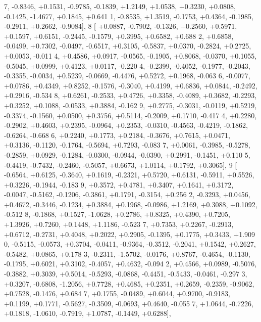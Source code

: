 \begin{DoxyCode}
      7, -0.8346, +0.1531, -0.9785, -0.1839, +1.2149, +1.0538, +0.3230, +0.0808, -0.1425, -1.4677, +0.1845, +0.641
      1, -0.8535, +1.3519, -0.1753, +0.4364, -0.1985, -0.2911, +0.2662, -0.9084],
8 [ +0.0887, -0.7902, -0.1326, +0.2560, +0.5971, +0.1597, +0.6151, -0.2445, -0.1579, +0.3995, +0.6582, +0.688
      2, +0.6858, -0.0499, +0.7302, -0.0497, -0.6517, +0.3105, -0.5837, +0.0370, -0.2824, +0.2725, +0.0053, -0.011
      4, +0.4586, +0.0917, -0.0565, -0.1905, +0.8068, -0.0370, +0.1055, -0.5045, +0.0999, +0.4123, +0.0117, -0.220
      4, -0.2399, -0.4052, -0.1977, -0.2043, -0.3355, -0.0034, +0.5239, -0.0669, -0.4476, +0.5272, +0.1968, -0.063
      6, -0.0077, +0.0786, +0.4349, +0.8252, -0.1576, -0.3040, +0.4199, +0.6836, +0.0844, -0.2492, +0.2916, -0.534
      8, +0.6261, -0.2533, +0.4726, +0.3358, -0.4089, +0.3682, -0.2293, +0.3252, +0.1088, -0.0533, +0.3884, -0.162
      9, +0.2775, -0.3031, -0.0119, +0.5219, -0.3374, -0.1560, +0.0500, +0.3756, +0.5114, -0.2009, +0.1710, -0.417
      4, +0.2280, -0.2902, +0.4603, +0.2395, -0.0964, +0.2353, -0.0310, -0.4563, -0.4219, -0.1862, -0.6264, -0.668
      6, +0.2240, +0.1773, +0.2184, -0.3676, +0.7615, +0.0471, +0.3136, -0.1120, -0.1764, -0.5694, +0.7293, -0.083
      7, +0.0061, -0.3985, -0.5278, -0.2859, +0.0929, -0.1284, -0.0300, -0.0944, -0.0390, +0.2991, -0.1451, +0.110
      5, -0.4419, -0.7432, -0.2460, -0.5057, +0.6673, +1.0114, +0.1792, +0.3065],
9 [ -0.6564, +0.6125, -0.3640, +0.1619, -0.2321, +0.5720, +0.6131, -0.5911, +0.5526, +0.3226, -0.1944, -0.183
      9, +0.3572, +0.4781, +0.3407, +0.1641, +0.3172, -0.0047, -0.5162, -0.1206, -0.3861, +0.1791, -0.3154, +0.256
      2, -0.3293, +0.0456, +0.4672, -0.3446, -0.1234, +0.3884, +0.1968, -0.0986, +1.2169, +0.3088, +0.1092, -0.512
      8, -0.1868, +0.1527, -1.0628, +0.2786, +0.8325, +0.4390, +0.7205, +1.3926, +0.7260, +0.1448, +1.1186, -0.523
      7, +0.7353, +0.2267, -0.2913, +0.6712, -0.2731, +0.4048, +0.2022, +0.2905, -0.1395, +0.1775, +0.3433, +1.909
      0, -0.5115, -0.0573, +0.3704, -0.0411, -0.9364, -0.3512, -0.2041, +0.1542, +0.2627, -0.5482, +0.0865, +0.178
      3, -0.2311, -1.5702, -0.0176, +0.8767, -0.4654, -0.1130, -0.1795, +0.6021, +0.3102, -0.4057, +0.4632, -0.094
      2, +0.4566, +0.0989, -0.5076, -0.3882, +0.3039, +0.5014, -0.5293, -0.0868, -0.4451, -0.5433, -0.0461, -0.297
      3, +0.3207, -0.6808, -1.2056, +0.7728, +0.4685, +0.2351, +0.2659, -0.2359, -0.9062, +0.7528, -0.1476, +0.684
      7, +0.1755, -0.0489, +0.6044, +0.9700, -0.9183, +0.1199, +0.1771, -0.5627, -0.3509, -0.0693, +0.4640, -0.055
      7, +1.0644, -0.7226, +0.1818, -1.0610, -0.7919, +1.0787, -0.1449, +0.6288],

\end{DoxyCode}
